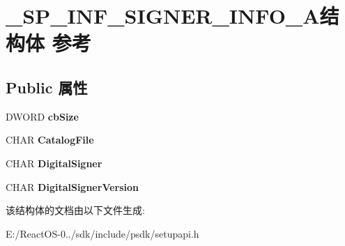 \hypertarget{struct___s_p___i_n_f___s_i_g_n_e_r___i_n_f_o___a}{}\section{\+\_\+\+S\+P\+\_\+\+I\+N\+F\+\_\+\+S\+I\+G\+N\+E\+R\+\_\+\+I\+N\+F\+O\+\_\+\+A结构体 参考}
\label{struct___s_p___i_n_f___s_i_g_n_e_r___i_n_f_o___a}
\subsection*{Public 属性}
\begin{DoxyCompactItemize}
\item 
\mbox{\label{struct___s_p___i_n_f___s_i_g_n_e_r___i_n_f_o___a_a8218e9da89423a10d032e497edb1a73c}} 
D\+W\+O\+RD {\bfseries cb\+Size}
\item 
\mbox{\label{struct___s_p___i_n_f___s_i_g_n_e_r___i_n_f_o___a_a45c7908a2a7c820acca0d3cdf1a6e35e}} 
C\+H\+AR {\bfseries Catalog\+File}
\item 
\mbox{\label{struct___s_p___i_n_f___s_i_g_n_e_r___i_n_f_o___a_a76ee2e5877386401089530a39432cb9c}} 
C\+H\+AR {\bfseries Digital\+Signer}
\item 
\mbox{\label{struct___s_p___i_n_f___s_i_g_n_e_r___i_n_f_o___a_a7e33ab09a719619daf0ce7432e2b17ac}} 
C\+H\+AR {\bfseries Digital\+Signer\+Version}
\end{DoxyCompactItemize}


该结构体的文档由以下文件生成\+:\begin{DoxyCompactItemize}
\item 
E\+:/\+React\+O\+S-\/0../sdk/include/psdk/setupapi.\+h\end{DoxyCompactItemize}
